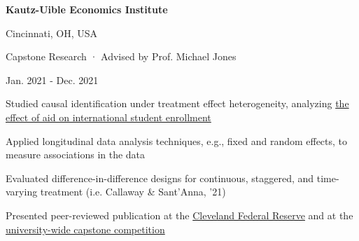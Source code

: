     \begin{minipage}{.75\linewidth} \begin{flushleft}
    		\textbf{Kautz-Uible Economics Institute}
    	\end{flushleft} \end{minipage}
    \hfill 
    \begin{minipage}{.20\linewidth}\begin{flushright}
    	 Cincinnati, OH, USA
    	\end{flushright}\end{minipage}
     
    \begin{minipage}{.75\linewidth} \begin{flushleft}
    		Capstone Research · Advised by Prof. Michael Jones
    	\end{flushleft} \end{minipage}
    \hfill 
    \begin{minipage}{.20\linewidth}\begin{flushright}
    	 Jan. 2021 - Dec. 2021
    	\end{flushright}\end{minipage}
        \vspace{-5pt}
	\begin{description}[font=$\bullet$]
	   \item{Studied causal identification under treatment effect heterogeneity, analyzing \href{https://ir.library.louisville.edu/jsfa/vol51/iss3/4/}{the effect of aid on international student enrollment}}
       \vspace{-6pt}
       \item{Applied longitudinal data analysis techniques, e.g., fixed and random effects, to measure associations in the data}
       \vspace{-6pt}
       \item{Evaluated difference-in-difference designs for continuous, staggered, and time-varying treatment (i.e. Callaway \& Sant'Anna, '21)}
       \vspace{-6pt}
       \item{Presented peer-reviewed publication at the \href{https://github.com/posmikdc/posmikdc.github.io/blob/master/pdf/PosmikDaniel_ESPPresentation.pdf}{Cleveland Federal Reserve} and at the \href{https://journals.uc.edu/index.php/Undergradshowcase/article/view/4431}{university-wide capstone competition}}
	\end{description}

